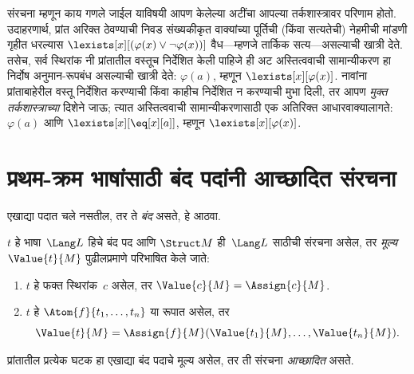 \begin{digress}
संरचना म्हणून काय गणले जाईल याविषयी आपण केलेल्या अटींचा आपल्या
तर्कशास्त्रावर परिणाम होतो. उदाहरणार्थ, प्रांत अरिक्त ठेवण्याची निवड
संख्यकीकृत वाक्यांच्या पूर्तिची (किंवा सत्यतेची) नेहमीची मांडणी गृहीत
धरल्यास $\lexists[x][(\varphi(x) \lor \lnot \varphi(x))]$ वैध---म्हणजे तार्किक
सत्य---असल्याची खात्री देते. तसेच, सर्व स्थिरांक नी प्रांतातील
वस्तूच निर्देशित केली पाहिजे ही अट अस्तित्ववाची सामान्यीकरण हा
निर्दोष अनुमान-रूपबंध असल्याची खात्री देते: $\varphi(a)$, म्हणून
$\lexists[x][\varphi(x)]$. नावांना प्रांताबाहेरील वस्तू निर्देशित करण्याची
किंवा काहीच निर्देशित न करण्याची मुभा दिली, तर आपण \emph{मुक्त
तर्कशास्त्राच्या} दिशेने जाऊ; त्यात अस्तित्ववाची सामान्यीकरणासाठी एक
अतिरिक्त आधारवाक्यालागते: $\varphi(a)$ आणि $\lexists[x][\eq[x][a]]$, म्हणून
$\lexists[x][\varphi(x)]$.
\end{digress}












\section{प्रथम-क्रम भाषांसाठी बंद पदांनी आच्छादित संरचना}\label{fol:syn:cov:sec}

\begin{explain}
एखाद्या पदात चले नसतील, तर ते \emph{बंद} असते, हे आठवा.
\end{explain}

\begin{defn}[बंद पदांचे मूल्य]
$t$ हे भाषा~$\Lang L$ हिचे बंद पद आणि $\Struct M$ ही~$\Lang L$ साठीची
संरचना असेल, तर \emph{मूल्य}~$\Value{t}{M}$ पुढीलप्रमाणे
परिभाषित केले जाते:
\begin{enumerate}
\item $t$ हे फक्त स्थिरांक~$c$ असेल, तर
  $\Value{c}{M} = \Assign{c}{M}$.
\item $t$ हे $\Atom{f}{t_1, \ldots, t_n}$ या रूपात असेल, तर
  \[  \Value{t}{M} = \Assign{f}{M}(\Value{t_1}{M}, \ldots,
  \Value{t_n}{M}).
  \]
\end{enumerate}
\end{defn}

\begin{defn}[आच्छादित संरचना]
प्रांतातील प्रत्येक घटक हा एखाद्या बंद पदाचे मूल्य असेल, तर ती
संरचना \emph{आच्छादित} असते.
\end{defn}

